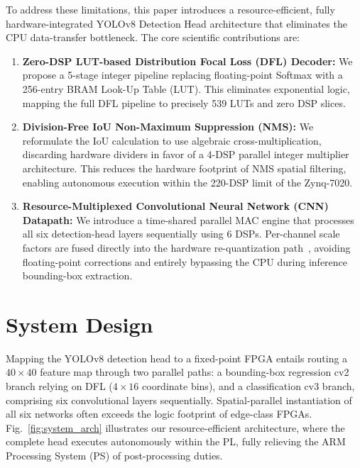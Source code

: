 \documentclass{svproc}
\begin{document}
To address these limitations, this paper introduces a resource-efficient, fully hardware-integrated YOLOv8 Detection Head architecture that eliminates the CPU data-transfer bottleneck. The core scientific contributions are:
\begin{enumerate}
    \item \textbf{Zero-DSP LUT-based Distribution Focal Loss (DFL) Decoder:} We propose a 5-stage integer pipeline replacing floating-point Softmax with a 256-entry BRAM Look-Up Table (LUT). This eliminates exponential logic, mapping the full DFL pipeline to precisely 539 LUTs and zero DSP slices.
    \item \textbf{Division-Free IoU Non-Maximum Suppression (NMS):} We reformulate the IoU calculation to use algebraic cross-multiplication, discarding hardware dividers in favor of a 4-DSP parallel integer multiplier architecture. This reduces the hardware footprint of NMS spatial filtering, enabling autonomous execution within the 220-DSP limit of the Zynq-7020.
    \item \textbf{Resource-Multiplexed Convolutional Neural Network (CNN) Datapath:} We introduce a time-shared parallel MAC engine that processes all six detection-head layers sequentially using 6 DSPs. Per-channel scale factors are fused directly into the hardware re-quantization path~\cite{jacob2018quantization}, avoiding floating-point corrections and entirely bypassing the CPU during inference bounding-box extraction.
\end{enumerate}

\section{System Design}
\label{sec:architecture}

Mapping the YOLOv8 detection head to a fixed-point FPGA entails routing a $40{\times}40$ feature map through two parallel paths: a bounding-box regression cv2 branch relying on DFL ($4{\times}16$ coordinate bins), and a classification cv3 branch, comprising six convolutional layers sequentially. Spatial-parallel instantiation of all six networks often exceeds the logic footprint of edge-class FPGAs. Fig.~\ref{fig:system_arch} illustrates our resource-efficient architecture, where the complete head executes autonomously within the PL, fully relieving the ARM Processing System (PS) of post-processing duties.
\end{document}
